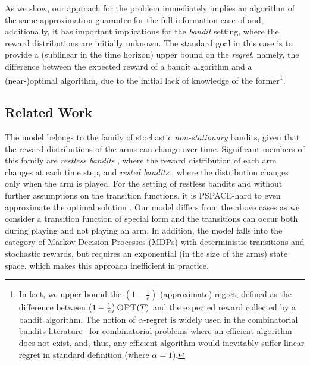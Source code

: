 As we show, our approach for the \rsm problem immediately implies an algorithm of the same approximation guarantee for the full-information case of \mbb and, additionally, it has important implications for the {\em bandit} setting, where the reward distributions are initially unknown. The standard goal in this case is to provide a (sublinear in the time horizon) upper bound on the {\em regret}, namely, the difference between the expected reward of a bandit algorithm and a (near-)optimal algorithm, due to the initial lack of knowledge of the former\footnote{
In fact, we upper bound the $\left(1 - \frac{1}{e}\right)${-(approximate) regret}, defined as the difference between $\left(1 - \frac{1}{e}\right) \textsc{OPT}(T)$ and the expected reward collected by a bandit algorithm. The notion of $\alpha$-regret is widely used in the combinatorial bandits literature~\cite{CWYW16,WC17} for combinatorial problems where an efficient algorithm does not exist, and, thus, any efficient algorithm would inevitably suffer linear regret in standard definition (where $\alpha = 1$).
}.



\subsection{Related Work}
The \mbb model belongs to the family of stochastic {\em non-stationary} bandits, given that the reward distributions of the arms can change over time. Significant members of this family are {\em restless bandits} \cite{Whittle88, GMS10}, where the reward distribution of each arm changes at each time step, and {\em rested bandits} \cite{Gittins79, TL12}, where the distribution changes only when the arm is played. For the setting of restless bandits and without further assumptions on the transition functions, it is PSPACE-hard to even approximate the optimal solution \cite{PT99}. Our model differs from the above cases as we consider a transition function of special form and the transitions can occur both during playing and not playing an arm. In addition, the \mbb model falls into the category of Markov Decision Processes (MDPs) with deterministic transitions and stochastic rewards, but requires an exponential (in the size of the arms) state space, which makes this approach inefficient in practice.

